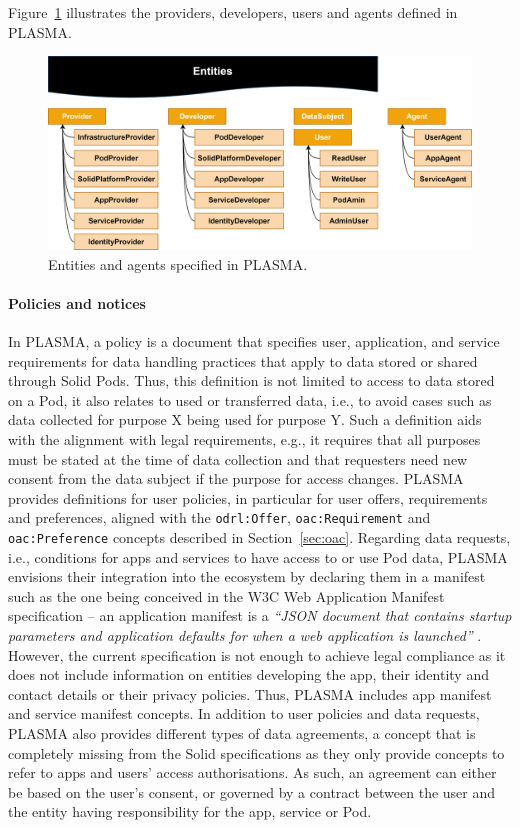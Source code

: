 Figure~\ref{fig:plasma_entities} illustrates the providers, developers, users and agents defined in PLASMA.

\begin{figure}[htbp]
    \centering
    \includegraphics[width=\linewidth]{figures/chapter-4/entities.png}
    \caption{Entities and agents specified in PLASMA.}
    \label{fig:plasma_entities}
\end{figure}

\paragraph{Policies and notices}
In PLASMA, a policy is a document that specifies user, application, and service requirements for data handling practices that apply to data stored or shared through Solid Pods.
Thus, this definition is not limited to access to data stored on a Pod, it also relates to used or transferred data, i.e., to avoid cases such as data collected for purpose X being used for purpose Y.
Such a definition aids with the alignment with legal requirements, e.g., it requires that all purposes must be stated at the time of data collection and that requesters need new consent from the data subject if the purpose for access changes.
PLASMA provides definitions for user policies, in particular for user offers, requirements and preferences, aligned with the \texttt{odrl:Offer}, \texttt{oac:Requirement} and \texttt{oac:Preference} concepts described in Section~\ref{sec:oac}.
Regarding data requests, i.e., conditions for apps and services to have access to or use Pod data, PLASMA envisions their integration into the ecosystem by declaring them in a manifest such as the one being conceived in the W3C Web Application Manifest specification -- an application manifest is a \textit{``JSON document that contains startup parameters and application defaults for when a web application is launched''} \citep{manifest_2023}.
However, the current specification is not enough to achieve legal compliance as it does not include information on entities developing the app, their identity and contact details or their privacy policies.
Thus, PLASMA includes app manifest and service manifest concepts.
In addition to user policies and data requests, PLASMA also provides different types of data agreements, a concept that is completely missing from the Solid specifications as they only provide concepts to refer to apps and users' access authorisations.
As such, an agreement can either be based on the user's consent, or governed by a contract between the user and the entity having responsibility for the app, service or Pod.

